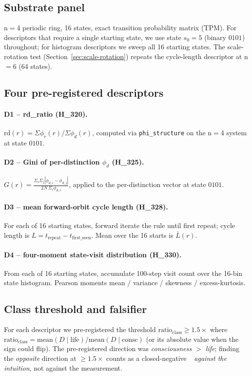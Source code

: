 \documentclass[11pt,a4paper]{article}
\providecommand{\tierRed}{🔴}
\begin{document}
\subsection{Substrate panel}
n$=$4 periodic ring, 16 states, exact transition probability matrix
(TPM). For descriptors that require a single starting state, we use
state $s_0 = 5$ (binary $0101$) throughout; for histogram descriptors
we sweep all 16 starting states. The scale-rotation test
(Section~\ref{sec:scale-rotation}) repeats the cycle-length
descriptor at n$=$6 (64 states).

\subsection{Four pre-registered descriptors}

\paragraph{D1 -- rd\_ratio (H\_320).}
$\mathrm{rd}(r) = \Sigma \phi_r(r) / \Sigma \phi_d(r)$, computed via
\texttt{phi\_structure} on the n$=$4 system at state $0101$.

\paragraph{D2 -- Gini of per-distinction $\phi_d$ (H\_325).}
$G(r) = \frac{\Sigma_i \Sigma_j |\phi_{d,i}-\phi_{d,j}|}
              {2 N \, \Sigma_i \phi_{d,i}}$,
applied to the per-distinction vector at state $0101$.

\paragraph{D3 -- mean forward-orbit cycle length (H\_328).}
For each of 16 starting states, forward iterate the rule until first
repeat; cycle length is $L = t_{\mathrm{repeat}} - t_{\mathrm{first\_seen}}$.
Mean over the 16 starts is $\bar L(r)$.

\paragraph{D4 -- four-moment state-visit distribution (H\_330).}
From each of 16 starting states, accumulate 100-step visit count over
the 16-bin state histogram. Pearson moments
mean / variance / skewness / excess-kurtosis.

\subsection{Class threshold and falsifier}
For each descriptor we pre-registered the threshold
$\mathrm{ratio_{class}} \geq 1.5\times$ where
$\mathrm{ratio_{class}} =
\mathrm{mean}(D \mid \mathrm{life}) /
\mathrm{mean}(D \mid \mathrm{consc})$ (or its absolute value when the
sign could flip). The pre-registered direction was
\emph{consciousness $>$ life}; finding the \emph{opposite} direction at
$\geq 1.5\times$ counts as a closed-negative \tierRed\ \emph{against the
intuition}, not against the measurement.
\end{document}

